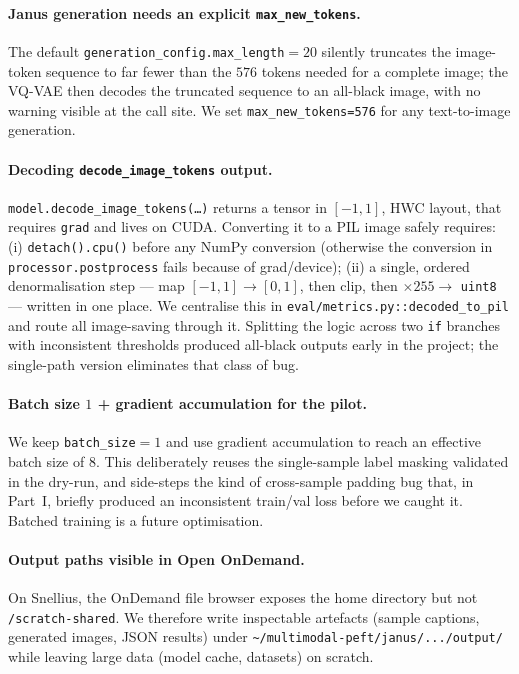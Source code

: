 \paragraph{Janus generation needs an explicit \texttt{max\_new\_tokens}.}
The default \texttt{generation\_config.max\_length}$=20$ silently truncates
the image-token sequence to far fewer than the $576$ tokens needed for a
complete image; the VQ-VAE then decodes the truncated sequence to an
all-black image, with no warning visible at the call site. We set
\texttt{max\_new\_tokens=576} for any text-to-image generation.

\paragraph{Decoding \texttt{decode\_image\_tokens} output.}
\texttt{model.decode\_image\_tokens(\dots)} returns a tensor in $[-1, 1]$,
HWC layout, that requires \texttt{grad} and lives on CUDA. Converting it to
a PIL image safely requires: (i) \texttt{detach().cpu()} before any NumPy
conversion (otherwise the conversion in \texttt{processor.postprocess} fails
because of grad/device); (ii) a single, ordered denormalisation step --- map
$[-1,1]\to[0,1]$, then clip, then $\times 255 \to$ \texttt{uint8} --- written
in one place. We centralise this in
\texttt{eval/metrics.py::decoded\_to\_pil} and route all image-saving
through it. Splitting the logic across two \texttt{if} branches with
inconsistent thresholds produced all-black outputs early in the project; the
single-path version eliminates that class of bug.

\paragraph{Batch size $1$ + gradient accumulation for the pilot.} We keep
\texttt{batch\_size}$=1$ and use gradient accumulation to reach an effective
batch size of $8$. This deliberately reuses the single-sample label
masking validated in the dry-run, and side-steps the kind of cross-sample
padding bug that, in Part~I, briefly produced an inconsistent train/val
loss before we caught it. Batched training is a future optimisation.

\paragraph{Output paths visible in Open OnDemand.} On Snellius, the
OnDemand file browser exposes the home directory but not
\texttt{/scratch-shared}. We therefore write inspectable artefacts (sample
captions, generated images, JSON results) under
\texttt{\textasciitilde/multimodal-peft/janus/.../output/} while leaving
large data (model cache, datasets) on scratch.


